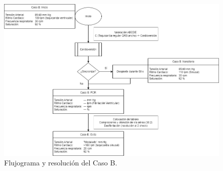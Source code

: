 \begin{figure}[hptb]
    \centering
	\includegraphics[width=0.766\linewidth]{./imagenes/ACV-AdSC-CasosUCI_CasoB.png}
	\caption{\label{fig:Brusilov:SVI:CasoA}Flujograma y resolución del Caso B.}
\end{figure}


